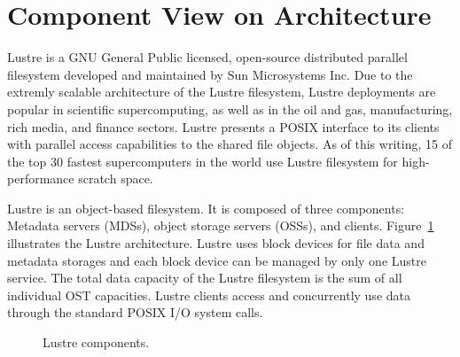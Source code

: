 \section{Component View on Architecture}

Lustre is a GNU General Public licensed, open-source distributed parallel
filesystem developed and maintained by Sun Microsystems Inc. Due to the
extremly scalable architecture of the Lustre filesystem, Lustre deployments
are popular in scientific supercomputing, as well as in the oil and gas,
manufacturing, rich media, and finance sectors. Lustre presents a POSIX
interface to its clients with parallel access capabilities to the shared file
objects. As of this writing, 15 of the top 30 fastest supercomputers in
the world use Lustre filesystem for high-performance scratch space.

Lustre is an object-based filesystem. It is composed
of three components: Metadata servers (MDSs), object storage servers (OSSs),
and clients.  Figure~\ref{fig:lustre-arch} illustrates the Lustre
architecture.  Lustre uses block devices for file data and metadata storages
and each block device can be managed by only one Lustre service. The total
data capacity of the Lustre filesystem is the sum of all individual OST
capacities.  Lustre clients access and concurrently use data through the
standard POSIX I/O system calls. 

\begin{figure}[hhhh]
     \begin{center}
             \caption{Lustre components.}
             \label{fig:lustre-arch}
     \end{center}
\end{figure}

